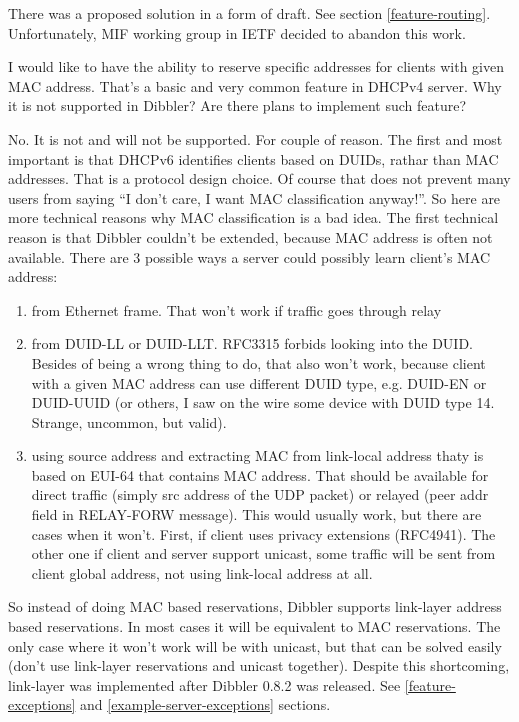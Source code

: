 There was a proposed solution in a form of \cite{draft-route-option}
draft. See section \ref{feature-routing}. Unfortunately, MIF working
group in IETF decided to abandon this work.

\Q I would like to have the ability to reserve specific addresses for
clients with given MAC address. That's a basic and very common feature
in DHCPv4 server. Why it is not supported in Dibbler? Are there plans
to implement such feature?

\A No. It is not and will not be supported. For couple of reason. The
first and most important is that DHCPv6 identifies clients based on
DUIDs, rathar than MAC addresses. That is a protocol design choice. Of
course that does not prevent many users from saying ``I don't care, I
want MAC classification anyway!''. So here are more technical reasons
why MAC classification is a bad idea. The first technical reason is
that Dibbler couldn't be extended, because MAC address is often not
available. There are 3 possible ways a server could possibly
learn client's MAC address:
\begin{enumerate}
\item from Ethernet frame. That won't work if traffic goes through
relay
\item from DUID-LL or DUID-LLT. RFC3315 forbids looking into the DUID.
Besides of being a wrong thing to do, that also won't work, because
client with a given MAC address can use different DUID type, e.g.
DUID-EN or DUID-UUID (or others, I saw on the wire some device with DUID
type 14. Strange, uncommon, but valid).
\item using source address and extracting MAC from link-local address
thaty is based on EUI-64 that contains MAC address. That should be
available for direct traffic (simply src address of the UDP packet) or
relayed (peer addr field in RELAY-FORW message). This would usually
work, but there are cases when it won't. First, if client uses privacy
extensions (RFC4941). The other one if client and server support
unicast, some traffic will be sent from client global address, not
using link-local address at all.
\end{enumerate}

So instead of doing MAC based reservations, Dibbler supports
link-layer address based reservations. In most cases it will be
equivalent to MAC reservations. The only case where it won't work will
be with unicast, but that can be solved easily (don't use link-layer
reservations and unicast together). Despite this shortcoming,
link-layer was implemented after Dibbler 0.8.2 was
released. See \ref{feature-exceptions}
and \ref{example-server-exceptions} sections.

